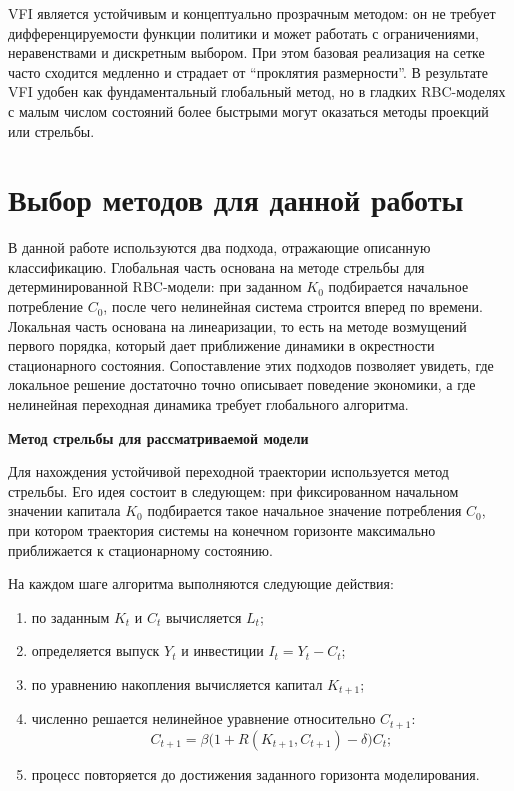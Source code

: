 VFI является устойчивым и концептуально прозрачным методом: он не требует
дифференцируемости функции политики и может работать с ограничениями,
неравенствами и дискретным выбором. При этом базовая реализация на сетке часто
сходится медленно и страдает от ``проклятия размерности''. В результате VFI
удобен как фундаментальный глобальный метод, но в гладких RBC-моделях с малым
числом состояний более быстрыми могут оказаться методы проекций или стрельбы.

\section{Выбор методов для данной работы}

В данной работе используются два подхода, отражающие описанную классификацию.
Глобальная часть основана на методе стрельбы для детерминированной RBC-модели:
при заданном $K_0$ подбирается начальное потребление $C_0$, после чего
нелинейная система строится вперед по времени. Локальная часть основана на
линеаризации, то есть на методе возмущений первого порядка, который дает
приближение динамики в окрестности стационарного состояния. Сопоставление этих
подходов позволяет увидеть, где локальное решение достаточно точно описывает
поведение экономики, а где нелинейная переходная динамика требует глобального
алгоритма.

\medskip
\noindent\textbf{Метод стрельбы для рассматриваемой модели}
\par\smallskip

Для нахождения устойчивой переходной траектории используется метод стрельбы. Его идея состоит в следующем: при фиксированном начальном значении капитала $K_0$ подбирается такое начальное значение потребления $C_0$, при котором траектория системы на конечном горизонте максимально приближается к стационарному состоянию.

На каждом шаге алгоритма выполняются следующие действия:
\begin{enumerate}[label=\arabic*)]
    \item по заданным $K_t$ и $C_t$ вычисляется $L_t$;
    \item определяется выпуск $Y_t$ и инвестиции $I_t=Y_t-C_t$;
    \item по уравнению накопления вычисляется капитал $K_{t+1}$;
    \item численно решается нелинейное уравнение относительно $C_{t+1}$:
    \begin{equation}
    C_{t+1}=\beta\bigl(1+R(K_{t+1},C_{t+1})-\delta\bigr)C_t;
    \end{equation}
    \item процесс повторяется до достижения заданного горизонта моделирования.
\end{enumerate}

